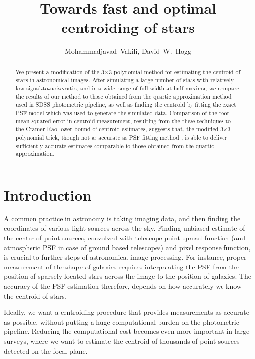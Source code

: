 \documentclass[12pt, preprint]{aastex}
\begin{document}
\author{
  Mohammadjavad~Vakili,
  David~W.~Hogg
}

\title{Towards fast and optimal centroiding of stars}

\begin{abstract}

We present a modification of the 3$\times$3 polynomial method for estimating the centroid 
of stars in astronomical images. After simulating a large number of stars with relatively low 
signal-to-noise-ratio, and in a wide range of full width at half maxima, we compare the results of our method
to those obtained from the quartic approximation method used in SDSS photometric pipeline, 
as well as finding the centroid by fitting the exact PSF model which was used to generate the 
simulated data. Comparison of the root-mean-squared error in centroid measurement, resulting 
from the these techniques to the Cramer-Rao lower bound of centroid estimates, 
suggests that, the modified 3$\times$3 polynomial trick, though not as accurate as PSF fitting method
, is able to deliver sufficiently accurate estimates comparable to those obtained from the quartic approximation.

\end{abstract}

\section{Introduction}

A common practice in astronomy is taking imaging data, and then finding the coordinates of various light sources across the sky. Finding unbiased estimate of the center of point sources, convolved with telescope point spread function (and atmospheric PSF in case of ground based telescopes) and pixel response function, is crucial to further steps of astronomical image processing. For instance, proper measurement of the shape of galaxies requires interpolating the PSF from the position of sparsely located stars across the image to the position of galaxies. The accuracy of the PSF estimation therefore, depends on how accurately we know the centroid of stars.

Ideally, we want a centroiding procedure that provides measurements as accurate as possible, without putting a huge computational burden on the photometric pipeline. Reducing the computational cost becomes even more important in large surveys, where we want to estimate the centroid of thousands of point sources detected on the focal plane. 
\end{document}
